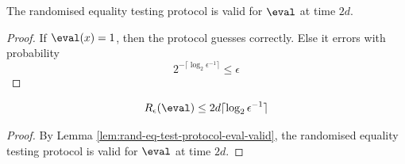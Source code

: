 \begin{lemma}
  \label{lem:rand-eq-test-protocol-eval-valid}

  The randomised equality testing protocol is valid for $\eval$ at time $2d$.
\end{lemma}
\begin{proof}

  If $\eval(x) = 1$, then the protocol guesses correctly. Else it errors with probability
  $$2^{-\lceil{\log_2\epsilon^{-1}}\rceil} \le \epsilon$$
\end{proof}

\begin{theorem}
  \label{thm:eval-rand-complexity}

  $$R_\epsilon(\eval) \le 2d\lceil\log_2\epsilon^{-1}\rceil$$
\end{theorem}
\begin{proof}

  By Lemma \ref{lem:rand-eq-test-protocol-eval-valid}, the randomised equality testing protocol is valid for $\eval$ at time $2d$.
\end{proof}


%







